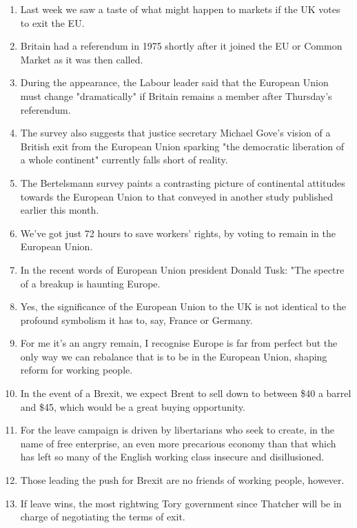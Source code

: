 \documentclass[fleqn,moreauthors,10pt]{ds_report}
\begin{document}
\begin{enumerate}
    \item Last week we saw a taste of what might happen to markets if the UK votes to exit the EU.
    \item Britain had a referendum in 1975 shortly after it joined the EU or Common Market as it was then called.
    \item During the appearance, the Labour leader said that the European Union must change "dramatically" if Britain remains a member after Thursday's referendum.
    \item The survey also suggests that justice secretary Michael Gove's vision of a British exit from the European Union sparking "the democratic liberation of a whole continent" currently falls short of reality.
    \item The Bertelsmann survey paints a contrasting picture of continental attitudes towards the European Union to that conveyed in another study published earlier this month.
    \item We've got just 72 hours to save workers' rights, by voting to remain in the	European Union.
    \item In the recent words of European Union president Donald Tusk: "The spectre of a breakup is haunting Europe.
    \item Yes, the significance of the European Union to the UK is not identical to the profound symbolism it has to, say, France or Germany.
    \item For me it's an angry remain, I recognise Europe is far from perfect but the only way we can rebalance that is to be in the European Union, shaping reform for working people.
    \item In the event of a Brexit, we expect Brent to sell down to between \$40 a barrel and \$45, which would be a great buying opportunity.
    \item For the leave campaign is driven by libertarians who seek to create, in the name of free enterprise, an even more precarious economy than that which has left so many of the English working class insecure and disillusioned.
    \item Those leading the push for Brexit are no friends of working people, however.
    \item If leave wins, the most rightwing Tory government since Thatcher will be in charge of negotiating the terms of exit.
\end{enumerate}
\end{document}
